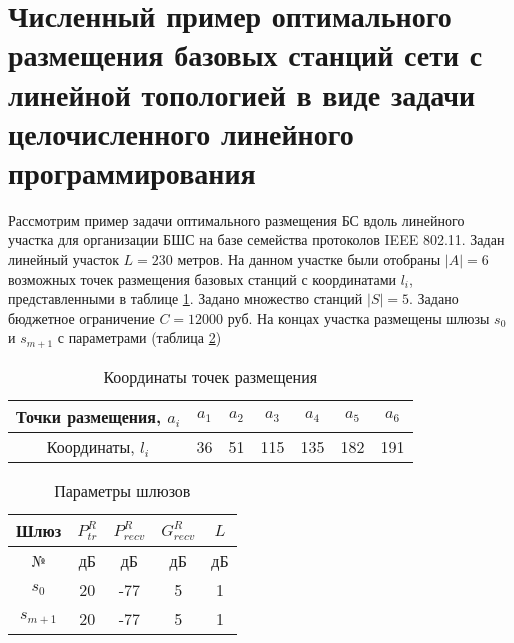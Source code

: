 

\section{Численный пример оптимального размещения базовых станций сети с линейной топологией в виде задачи целочисленного линейного программирования}\label{part4:ilp_solution}

Рассмотрим пример задачи оптимального размещения БС вдоль линейного участка для организации БШС на базе семейства протоколов IEEE 802.11. Задан линейный участок $L =230$ метров. На данном участке были отобраны $|A| =6$ возможных точек размещения базовых станций с координатами $l_i$, представленными в таблице \cref{tab:placement_point_mip}. Задано множество станций $|S| =5$. Задано бюджетное ограничение $C = 12000$ руб. На концах участка размещены шлюзы $s_0 $ и $s_{m+1}$ с параметрами (таблица \cref{tab:part4_gateway_parameters_mip})

\begin{table}[h!]\centering
  \begin{tabular}{|c||c|c|c|c|c|c|}\hline
      Точки размещения, $a_i$ &	$a_1$&	$a_2$&	$a_3$&	$a_4$&	$a_5$&	$a_6$ \\
      \hline
      Координаты, $l_i$ &	36&	51&	115&	135&	182&	191\\
      \hline
\end{tabular}\caption{Координаты точек размещения}\label{tab:placement_point_mip}
\end{table}


\begin{table}[h!]\centering
  \begin{tabular}{|c||c|c|c|c|}\hline
      
      Шлюз&	$P_{tr}^R$&	$P_{recv}^R$& $G_{recv}^R$&	$L$ \\
      \hline
      №&	дБ&	дБ&	дБ&	дБ \\
      \hline
      $s_0 $& 20&	-77&	5& 1 \\
      $s_{m+1}$& 20& -77&	5& 	1 \\
      \hline

\end{tabular}\caption{Параметры шлюзов}\label{tab:part4_gateway_parameters_mip}
\end{table}

